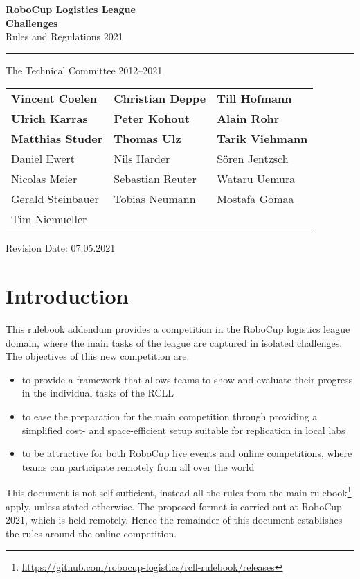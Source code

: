 \documentclass[12pt,twoside]{article}
\begin{document}
\begin{titlepage}
 \vspace*{5cm}
 \begin{center}
  \begin{LARGE}

   {\bf RoboCup Logistics League}\\[2ex]
   {\Large \bf{Challenges}}\\[4ex]
   {\Large Rules and Regulations 2021}\\[4ex]
  \end{LARGE}
  \hrule

  {\LARGE\vspace*{4ex}}
  \begin{Large}
   The Technical Committee 2012--2021\\[6ex]
  \end{Large}
  \begin{tabular}{lll}
   \textbf{Vincent Coelen}&\textbf{Christian Deppe}&\textbf{Till Hofmann}\\
	\textbf{Ulrich Karras}&\textbf{Peter Kohout}&\textbf{Alain Rohr}\\
	\textbf{Matthias Studer} &\textbf{Thomas Ulz}&\textbf{Tarik Viehmann}\\[.5em]
   Daniel Ewert&Nils Harder&S\"oren Jentzsch\\
   Nicolas Meier&Sebastian Reuter&Wataru Uemura\\
   Gerald Steinbauer&Tobias Neumann&Mostafa Gomaa\\
	 Tim Niemueller
  \end{tabular}
  \vfill
  Revision Date: 07.05.2021\\
 \end{center}
\end{titlepage}


\section{Introduction}
\label{sec:intro}
This rulebook addendum provides a competition in the RoboCup logistics
league domain, where the main tasks of the league are captured in isolated
challenges.
The objectives of this new competition are:
\begin{itemize}
 \item to provide a framework that allows teams to show and evaluate their
       progress in the individual tasks of the RCLL
 \item to ease the preparation for the main competition through providing a
       simplified cost- and space-efficient setup suitable for replication in
       local labs
 \item to be attractive for both RoboCup live events and online competitions,
       where teams can participate remotely from all over the world
\end{itemize}
This document is not self-sufficient, instead all the rules from the main
rulebook\footnote{\url{https://github.com/robocup-logistics/rcll-rulebook/releases}}
apply, unless stated otherwise.
The proposed format is carried out at RoboCup 2021, which is held remotely.
Hence the remainder of this document establishes the rules around the online
competition.
\end{document}
